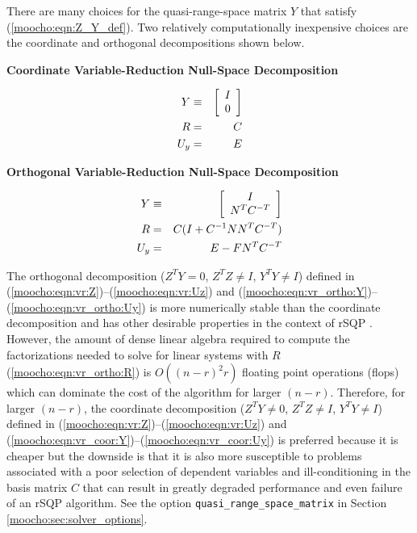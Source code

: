 \documentclass[pdf,ps2pdf,11pt]{SANDreport}
\begin{document}
{There are many choices for the quasi-range-space matrix $Y$ that
satisfy (\ref{moocho:eqn:Z_Y_def}).  Two relatively computationally
inexpensive choices are the coordinate and orthogonal decompositions
shown below.

{\bsinglespace
\begin{center}\textbf{Coordinate Variable-Reduction Null-Space Decomposition}\end{center}
\begin{eqnarray}
Y & \equiv & {\bmat{c} I \\ 0 \emat}    \label{moocho:eqn:vr_coor:Y} \\
R & = & C                               \label{moocho:eqn:vr_coor:R} \\
U_y & = & E                             \label{moocho:eqn:vr_coor:Uy}
\end{eqnarray}

\begin{center}\textbf{Orthogonal Variable-Reduction Null-Space Decomposition}\end{center}
\begin{eqnarray}
Y & \equiv & {\bmat{c} I \\ N^T C^{-T} \emat}       \label{moocho:eqn:vr_ortho:Y} \\
R & = & C (I + C^{-1 }N N^T C^{-T})                 \label{moocho:eqn:vr_ortho:R} \\
U_y & = & E - F N^T C^{-T}                          \label{moocho:eqn:vr_ortho:Uy}
\end{eqnarray}
\esinglespace}

The orthogonal decomposition ($Z^T Y = 0$, $Z^T Z \neq I$, $Y^T Y \neq
I$) defined in (\ref{moocho:eqn:vr:Z})--(\ref{moocho:eqn:vr:Uz}) and
(\ref{moocho:eqn:vr_ortho:Y})--(\ref{moocho:eqn:vr_ortho:Uy}) is more
numerically stable than the coordinate decomposition and has other
desirable properties in the context of rSQP
\cite{ref:schmid_accel_1993}.  However, the amount of dense linear
algebra required to compute the factorizations needed to solve for
linear systems with $R$ (\ref{moocho:eqn:vr_ortho:R}) is $O((n-r)^2
r)$ floating point operations (flops) which can dominate the cost of
the algorithm for larger $(n-r)$.  Therefore, for larger $(n-r)$, the
coordinate decomposition ($Z^T Y \neq 0$, $Z^T Z \neq I$, $Y^T Y \neq
I$) defined in (\ref{moocho:eqn:vr:Z})--(\ref{moocho:eqn:vr:Uz}) and
(\ref{moocho:eqn:vr_coor:Y})--(\ref{moocho:eqn:vr_coor:Uy}) is
preferred because it is cheaper but the downside is that it is also
more susceptible to problems associated with a poor selection of
dependent variables and ill-conditioning in the basis matrix $C$ that
can result in greatly degraded performance and even failure of an rSQP
algorithm.  See the option \texttt{quasi\-\_range\-\_space\-\_matrix}
in Section \ref{moocho:sec:solver_options}.

}
\end{document}
